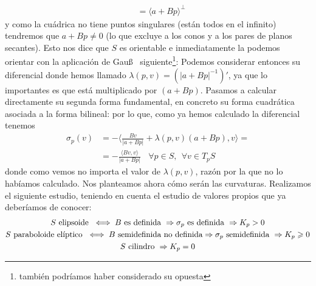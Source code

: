 \begin{ejercicio}
\begin{enumerate}
\begin{align*}
            &= \langle a + Bp \rangle^{\bot}
        \end{align*}
        y como la cuádrica no tiene puntos singulares (están todos en el infinito) tendremos que $a + Bp \neq 0$ (lo que excluye a los conos y a los pares de planos secantes). Esto nos dice que $S$ es orientable e inmediatamente la podemos orientar con la aplicación de Gau\ss~ siguiente\footnote{también podríamos haber considerado su opuesta}:
        Podemos considerar entonces su diferencial
        donde hemos llamado $\lambda(p,v) = (|a+Bp|^{-1})'$, ya que lo importantes es que está multiplicado por $(a+Bp)$. Pasamos a calcular directamente su segunda forma fundamental, en concreto su forma cuadrática asociada a la forma bilineal:
        por lo que, como ya hemos calculado la diferencial tenemos 
        \begin{align*}
            \sigma_p(v) &= - \langle \frac{Bv}{|a+Bp|} + \lambda(p,v)(a+Bp), v \rangle = \\
            &= - \frac{\langle Bv,v\rangle}{|a+Bp|}\ \ \ \ \forall p \in S,\ \ \forall v \in T_pS
        \end{align*}
        donde como vemos no importa el valor de $\lambda(p,v)$, razón por la que no lo habíamos calculado. Nos planteamos ahora cómo serán las curvaturas. Realizamos el siguiente estudio, teniendo en cuenta el estudio de valores propios que ya deberíamos de conocer: 
        \begin{gather*}
            S \text{ elipsoide } \iff B \text{ es definida } \Rightarrow \sigma_p \text{ es definida } \Rightarrow K_p > 0\\
            S \text{ paraboloide elíptico } \iff B \text{ semidefinida no definida} \Rightarrow \sigma_p \text{ semidefinida } \Rightarrow K_p \geqslant 0\\
            S \text{ cilindro } \Rightarrow K_p = 0
        \end{gather*}


\end{enumerate}
\end{ejercicio}
